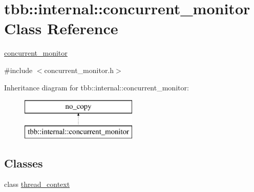 \hypertarget{classtbb_1_1internal_1_1concurrent__monitor}{}\section{tbb\+:\+:internal\+:\+:concurrent\+\_\+monitor Class Reference}
\label{classtbb_1_1internal_1_1concurrent__monitor}


\hyperlink{classtbb_1_1internal_1_1concurrent__monitor}{concurrent\+\_\+monitor}  




{\ttfamily \#include $<$concurrent\+\_\+monitor.\+h$>$}

Inheritance diagram for tbb\+:\+:internal\+:\+:concurrent\+\_\+monitor\+:\begin{figure}[H]
\begin{center}
\leavevmode
\includegraphics[height=2.000000cm]{classtbb_1_1internal_1_1concurrent__monitor}
\end{center}
\end{figure}
\subsection*{Classes}
\begin{DoxyCompactItemize}
\item 
class \hyperlink{classtbb_1_1internal_1_1concurrent__monitor_1_1thread__context}{thread\+\_\+context}
\end{DoxyCompactItemize}
